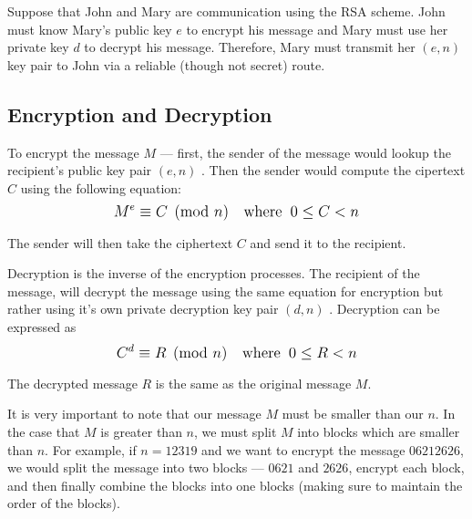 Suppose that John and Mary are communication using the RSA scheme. John must know Mary's public key $e$ to encrypt his message and Mary must use her private key $d$ to 
decrypt his message. Therefore, Mary must transmit her $(e,n)$ key pair to John via a reliable (though not secret) route. 

\subsection{Encryption and Decryption}

To encrypt the message $M$ --- first, the sender of the message would lookup the recipient's public key pair $(e,n)$ \cite{classical_algebra}. 
Then the sender would compute the cipertext $C$ using the following equation: 
$$\mathlarger{M^e \equiv C \pmod{n} \text{\hspace{1em}where\;\;}0 \leq C < n}$$

The sender will then take the ciphertext $C$ and send it to the recipient.

Decryption is the inverse of the encryption processes. The recipient of the message, will decrypt the message using the same equation for encryption but rather using it's
own private decryption key pair $(d,n)$ \cite{classical_algebra}. Decryption can be expressed as 
$$\mathlarger{C^d \equiv R \pmod{n} \text{\hspace{1em}where\;\;}0 \leq R < n}$$

The decrypted message $R$ is the same as the original message $M$.

It is very important to note that our message $M$ must be smaller than our $n$. In the case that $M$ is greater than $n$, we must split $M$ into blocks which are smaller
than $n$. For example, if $n=12319$ and we want to encrypt the message $06212626$, we would split the message into two blocks --- $0621$ and $2626$, encrypt each block, 
and then finally combine the blocks into one blocks (making sure to maintain the order of the blocks).
